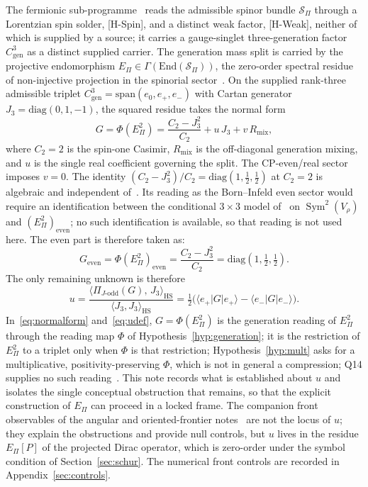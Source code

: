 \documentclass[11pt]{article}
\theoremstyle{definition}
\newcommand{\HS}{\mathrm{HS}}
\newcommand{\Cgen}{C^3_{\mathrm{gen}}}
\newcommand{\EPi}{E_\Pi}
\begin{document}
    The fermionic sub-programme~\cite{Beau2026q14} reads the admissible spinor bundle $\mathcal S_\Pi$ through
    a Lorentzian spin solder, [H-Spin], and a distinct weak factor, [H-Weak], neither of which is supplied by a source;
    it carries a gauge-singlet three-generation factor $\Cgen$ as a distinct supplied carrier.
    The generation mass split is carried by the projective endomorphism
    $E_\Pi\in\Gamma(\mathrm{End}(\mathcal S_\Pi))$, the zero-order spectral residue of non-injective
    projection in the spinorial sector~\cite{Beau2026q14}.
    On the supplied rank-three admissible triplet $\Cgen=\mathrm{span}(e_0,e_+,e_-)$ with Cartan
    generator
    $J_3=\mathrm{diag}(0,1,-1)$, the squared residue takes the normal form
    \begin{equation}
      \label{eq:normalform}
      G=\Phi(E_\Pi^2)=\frac{C_2-J_3^2}{C_2}+u\,J_3+v\,R_{\mathrm{mix}},
    \end{equation}
    where $C_2=2$ is the spin-one Casimir, $R_{\mathrm{mix}}$ is the off-diagonal generation mixing, and
    $u$ is the single real coefficient governing the split.
    The CP-even/real sector imposes $v=0$.
    The identity $(C_2-J_3^2)/C_2 = \mathrm{diag}(1,\tfrac12,\tfrac12)$ at $C_2=2$ is algebraic and
    independent of~\cite{Beau2026a34}.
    Its reading as the Born--Infeld even sector would require an identification between the
    conditional $3\times3$ model of~\cite{Beau2026a34} on $\operatorname{Sym}^2(V_\rho)$ and
    $(E_\Pi^2)_{\mathrm{even}}$; no such identification is available, so that reading is not used
    here.
    The even part is therefore taken as:
    \begin{equation}
      \label{eq:even}
      G_{\mathrm{even}}=\Phi(E_\Pi^2)_{\mathrm{even}}=\frac{C_2-J_3^2}{C_2}=\mathrm{diag}\!\left(1,\tfrac12,\tfrac12\right).
    \end{equation}
    The only remaining unknown is therefore
    \begin{equation}
      \label{eq:udef}
      u=\frac{\big\langle \Pi_{J\text{-odd}}(G),\,J_3\big\rangle_{\HS}}{\langle J_3,J_3\rangle_{\HS}}
      =\tfrac12\big(\langle e_+|G|e_+\rangle-\langle e_-|G|e_-\rangle\big).
    \end{equation}
    In~\eqref{eq:normalform} and~\eqref{eq:udef}, $G=\Phi(E_\Pi^2)$ is the generation reading of $E_\Pi^2$ through the
    reading map $\Phi$ of Hypothesis~\ref{hyp:generation}; it is the restriction of $E_\Pi^2$ to a triplet only when $\Phi$ is that restriction; Hypothesis~\ref{hyp:mult} asks
    for a multiplicative, positivity-preserving $\Phi$, which is not in general a compression; Q14 supplies no such reading~\cite{Beau2026q14}.
    This note records what is established about $u$ and isolates the single conceptual obstruction
    that remains, so that the explicit construction of $E_\Pi$ can proceed in a locked frame.
    The companion front observables of the angular and oriented-frontier
    notes~\cite{Beau2026aar, Beau2026q11of} are not the locus of $u$; they explain the obstructions and provide null
    controls, but $u$ lives in the residue $\EPi[P]$ of the projected Dirac operator, which is zero-order under
    the symbol condition of Section~\ref{sec:schur}.
    The numerical front controls are recorded in Appendix~\ref{sec:controls}.
\end{document}
